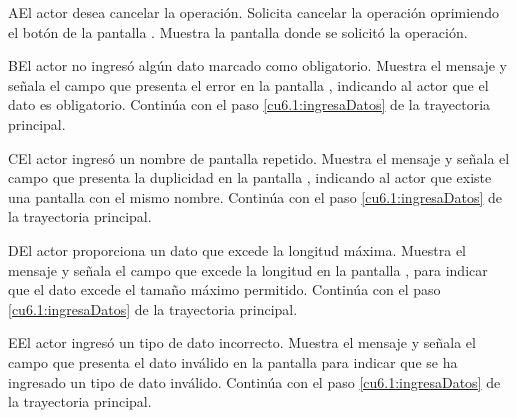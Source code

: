  \begin{UCtrayectoriaA}{A}{El actor desea cancelar la operación.}
    \UCpaso[\UCactor] Solicita cancelar la operación oprimiendo el botón  de la pantalla .
    \UCpaso[\UCsist] Muestra la pantalla donde se solicitó la operación.
 \end{UCtrayectoriaA} 
 \begin{UCtrayectoriaA}{B}{El actor no ingresó algún dato marcado como obligatorio.}
    \UCpaso[\UCsist] Muestra el mensaje  y señala el campo que presenta el error en la pantalla 
	    , indicando al actor que el dato es obligatorio.
    \UCpaso[] Continúa con el paso \ref{cu6.1:ingresaDatos} de la trayectoria principal.
 \end{UCtrayectoriaA}
 \begin{UCtrayectoriaA}{C}{El actor ingresó un nombre de pantalla repetido.}
    \UCpaso[\UCsist] Muestra el mensaje  y señala el campo que presenta la duplicidad en la pantalla 
	    , indicando al actor que existe una pantalla con el mismo nombre.
    \UCpaso[] Continúa con el paso \ref{cu6.1:ingresaDatos} de la trayectoria principal.
 \end{UCtrayectoriaA}
 
 \begin{UCtrayectoriaA}{D}{El actor proporciona un dato que excede la longitud máxima.}
    \UCpaso[\UCsist] Muestra el mensaje  y señala el campo que excede la 
    longitud en la pantalla , para indicar que el dato excede el tamaño máximo permitido.
    \UCpaso[] Continúa con el paso \ref{cu6.1:ingresaDatos} de la trayectoria principal.
 \end{UCtrayectoriaA}
 
 \begin{UCtrayectoriaA}{E}{El actor ingresó un tipo de dato incorrecto.}
    \UCpaso[\UCsist] Muestra el mensaje  y señala el campo que presenta el dato inválido en la 
    pantalla  para indicar que se ha ingresado un tipo de dato inválido.
    \UCpaso[] Continúa con el paso \ref{cu6.1:ingresaDatos} de la trayectoria principal.
 \end{UCtrayectoriaA}

